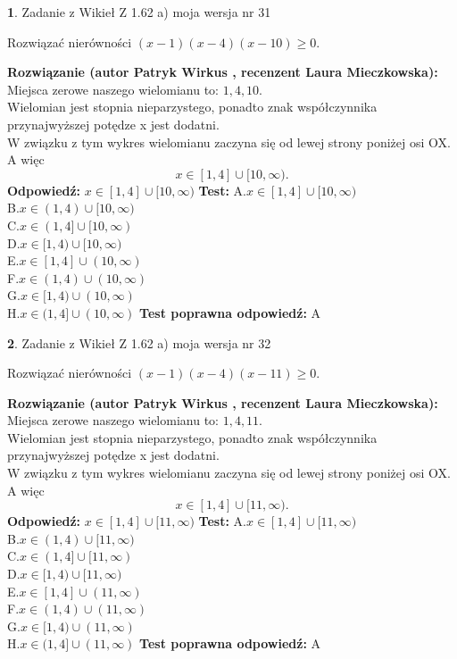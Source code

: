 \documentclass[12pt, a4paper]{article}
\theoremstyle{definition} %
\newtheorem{zad}{}
\newcommand{\zadStart}[1]{\begin{zad}#1\newline}
\newcommand{\zadStop}{\end{zad}}
\newcommand{\rozwStart}[2]{\noindent \textbf{Rozwiązanie (autor #1 , recenzent #2): }\newline}
\newcommand{\rozwStop}{\newline}
\newcommand{\odpStart}{\noindent \textbf{Odpowiedź:}\newline}
\newcommand{\odpStop}{\newline}
\newcommand{\testStart}{\noindent \textbf{Test:}\newline}
\newcommand{\testStop}{\newline}
\newcommand{\kluczStart}{\noindent \textbf{Test poprawna odpowiedź:}\newline}
\newcommand{\kluczStop}{\newline}
\begin{document}
\zadStart{Zadanie z Wikieł Z 1.62 a) moja wersja nr 31}

Rozwiązać nierówności $(x-1)(x-4)(x-10)\ge0$.
\zadStop
\rozwStart{Patryk Wirkus}{Laura Mieczkowska}
Miejsca zerowe naszego wielomianu to: $1, 4, 10$.\\
Wielomian jest stopnia nieparzystego, ponadto znak współczynnika przy\linebreak najwyższej potędze x jest dodatni.\\ W związku z tym wykres wielomianu zaczyna się od lewej strony poniżej osi OX. A więc $$x \in [1,4] \cup [10,\infty).$$
\rozwStop
\odpStart
$x \in [1,4] \cup [10,\infty)$
\odpStop
\testStart
A.$x \in [1,4] \cup [10,\infty)$\\
B.$x \in (1,4) \cup [10,\infty)$\\
C.$x \in (1,4] \cup [10,\infty)$\\
D.$x \in [1,4) \cup [10,\infty)$\\
E.$x \in [1,4] \cup (10,\infty)$\\
F.$x \in (1,4) \cup (10,\infty)$\\
G.$x \in [1,4) \cup (10,\infty)$\\
H.$x \in (1,4] \cup (10,\infty)$
\testStop
\kluczStart
A
\kluczStop



\zadStart{Zadanie z Wikieł Z 1.62 a) moja wersja nr 32}

Rozwiązać nierówności $(x-1)(x-4)(x-11)\ge0$.
\zadStop
\rozwStart{Patryk Wirkus}{Laura Mieczkowska}
Miejsca zerowe naszego wielomianu to: $1, 4, 11$.\\
Wielomian jest stopnia nieparzystego, ponadto znak współczynnika przy\linebreak najwyższej potędze x jest dodatni.\\ W związku z tym wykres wielomianu zaczyna się od lewej strony poniżej osi OX. A więc $$x \in [1,4] \cup [11,\infty).$$
\rozwStop
\odpStart
$x \in [1,4] \cup [11,\infty)$
\odpStop
\testStart
A.$x \in [1,4] \cup [11,\infty)$\\
B.$x \in (1,4) \cup [11,\infty)$\\
C.$x \in (1,4] \cup [11,\infty)$\\
D.$x \in [1,4) \cup [11,\infty)$\\
E.$x \in [1,4] \cup (11,\infty)$\\
F.$x \in (1,4) \cup (11,\infty)$\\
G.$x \in [1,4) \cup (11,\infty)$\\
H.$x \in (1,4] \cup (11,\infty)$
\testStop
\kluczStart
A
\kluczStop
\end{document}
